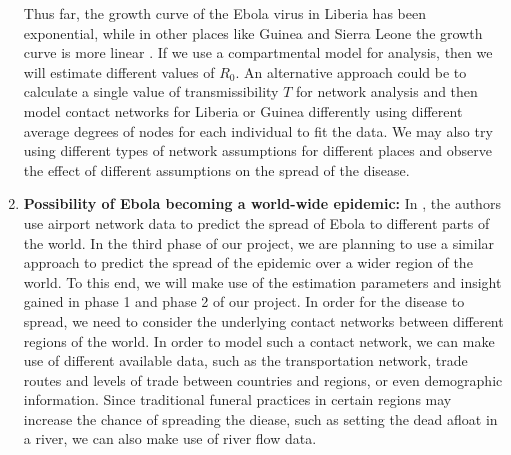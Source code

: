 \documentclass[10pt, journal,onecolumn]{IEEEtran}
\begin{document}
\begin{enumerate}
  Thus far, the growth curve of the Ebola virus in Liberia has been exponential, while in other
  places like Guinea and Sierra Leone the growth curve is more linear \citep{cmriversdata}.
  If we use a compartmental model for analysis, then we will estimate different values of
  $R_0$. An alternative approach could be to calculate a single value of transmissibility $T$ for
  network analysis and then model contact networks for Liberia or Guinea differently using
  different average degrees of nodes for each individual to fit the data.
  We may also try using different types of network assumptions for different places
  and observe the effect of different assumptions on the spread of the disease. \\

\item \textbf{Possibility of Ebola becoming a world-wide epidemic:} In \citep{gomes2014assessing},
  the authors use airport network data to predict the spread of Ebola to different parts of the
  world. In the third phase of our project, we are planning to use a similar approach to predict the
  spread of the epidemic over a wider region of the world. To this end, we will make use of the estimation
  parameters and insight gained in phase 1 and phase 2 of our project. In order for the disease to
  spread, we need to consider the underlying contact networks between different regions of the
  world. In order to model such a contact network, we can make use of different available data, such
  as the transportation network, trade routes and levels of trade between countries and regions, or
  even demographic information. Since traditional funeral practices in certain regions may increase
  the chance of spreading the diease, such as setting the dead afloat in a river, we can also make
  use of river flow data.

\end{enumerate}



%






\end{document}

